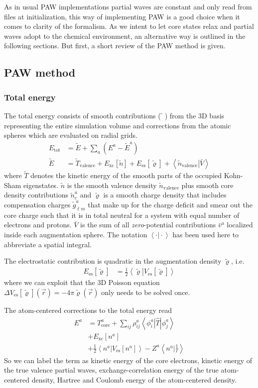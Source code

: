 \documentclass[oribibl]{llncs}
\newcommand{\um}[1]{_{\mathrm{#1}}}
\newcommand{\braket}[2]{\left\langle \left. #1 \right| #2 \right\rangle}
\newcommand{\braketop}[3]{\left\langle \left. #1 \right| #2 \left| #3 \right. \right\rangle}
\begin{document}
As in usual \ac{PAW} implementations partial waves are constant 
and only read from files at initialization, this way of implementing \ac{PAW}
is a good choice when it comes to clarity of the formalism.
As we intent to let core states relax and partial waves adopt
to the chemical environment,
an alternative way is outlined in the following sections.
But first, a short review of the \ac{PAW} method is given.

\subsection{PAW method}
%
\subsubsection{Total energy}
%
The total energy consists of smooth contributions ($\tilde{\phantom{x}}$) from the 3D basis
representing the entire simulation volume and corrections from the atomic spheres
which are evaluated on radial grids.
\begin{align}
	E\um{tot} &= \tilde E + \sum_a \left( E^a - \tilde E^a \right) \\
	\tilde E  &= \tilde T\um{valence} + E\um{xc}[\tilde n] + E\um{es}[\tilde\varrho] + \braket{\tilde n\um{valence}}{\bar V}
\end{align}
where $\tilde T$ denotes the kinetic energy of the smooth parts of the occupied Kohn-Sham eigenstates.
$\tilde n$ is the smooth valence density $\tilde n\um{valence}$ plus smooth core density contributions $\tilde n^a\um{c}$
and $\tilde\varrho$ is a smooth charge density that includes compensation charges $\tilde g_{\ell m}^a$
that make up for the charge deficit and smear out the core charge such that it is in total neutral
for a system with equal number of electrons and protons.
$\bar{V}$ is the sum of all \emph{zero}-potential contributions $\bar v^a$ localized inside
each augmentation sphere. The notation $\braket{\cdot}{\cdot}$ has been used here to 
abbreviate a spatial integral.

The electrostatic contribution is quadratic in the augmentation density $\tilde\varrho$, 
i.e.~
\begin{align}
E\um{es}[\tilde\varrho] &= \frac{1}{2} \braket{\tilde\varrho}{V\um{es}[\tilde\varrho]}
\end{align}
where we can exploit that the 3D Poisson equation $\Delta V\um{es}[\tilde\varrho](\vec r) = -4\pi\tilde\varrho(\vec r)$ only needs to be solved once.

The atom-centered corrections to the total energy read
\begin{align}
  E^a &= T^a\um{core} + \sum_{ij} \rho^a_{ij} \braketop{\phi^a_i}{\hat T}{\phi^a_j} \\
      &+ E\um{xc}[n^a] \\
      &+ \frac{1}{2} \braket{ n^a }{ V\um{es}[n^a] } - Z^a \braket{ n^a }{ \frac{1}{r} } 
      \label{eqn:total-energy-true-atom-corrections}
\end{align}
So we can label the term as kinetic energy of the core electrons, 
kinetic energy of the true valence partial waves,
exchange-correlation energy of the true atom-centered density,
Hartree and Coulomb energy of the atom-centered density.
\end{document}
